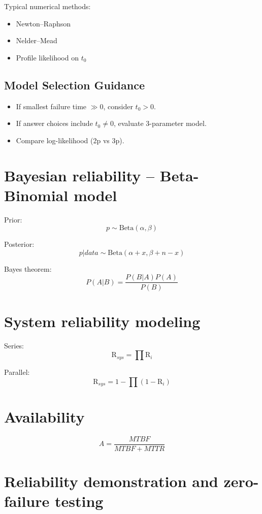 \documentclass[10pt,a4paper,twocolumn]{article}
\newcommand{\R}{\mathrm{R}}
\begin{document}
Typical numerical methods:
\begin{itemize}
\item Newton–Raphson
\item Nelder–Mead
\item Profile likelihood on $t_0$
\end{itemize}


\subsection*{Model Selection Guidance}

\begin{itemize}
\item If smallest failure time $\gg 0$, consider $t_0>0$.
\item If answer choices include $t_0 \neq 0$, evaluate 3-parameter model.
\item Compare log-likelihood (2p vs 3p).
\end{itemize}
\section*{Bayesian reliability – Beta-Binomial model}

Prior:
\[p\sim\text{Beta}(\alpha,\beta)\]

Posterior:
\[p|data\sim\text{Beta}(\alpha+x,\beta+n-x)\]

Bayes theorem:
\[P(A|B)=\frac{P(B|A)P(A)}{P(B)}\]

\section*{System reliability modeling}

Series:
\[
\R_{sys}=\prod \R_i
\]

Parallel:
\[\R_{sys}=1-\prod(1-\R_i)\]

\section*{Availability}

\[A=\frac{MTBF}{MTBF+MTTR}\]

\section*{Reliability demonstration and zero-failure testing}
\end{document}
